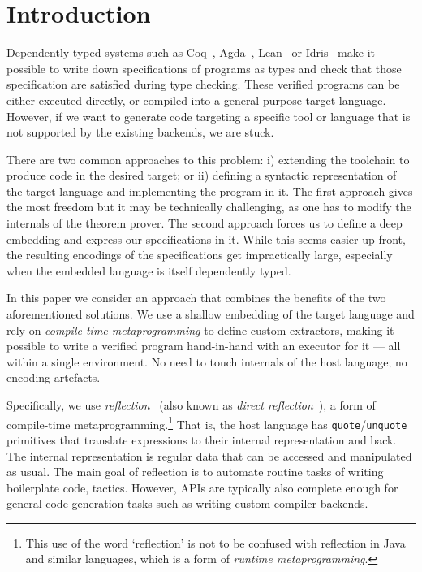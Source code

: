 \documentclass[acmsmall,review,anonymous]{acmart}\settopmatter{printfolios=true,printccs=false,printacmref=false}
\begin{document}
\section{Introduction}

Dependently-typed systems such as Coq~\cite{10.5555/1965123},
Agda~\cite{10.5555/1813347.1813352}, Lean~\cite{conf/cade/MouraKADR15}
or Idris~\cite{JFP:9060502} make it possible to write down specifications
of programs as types and check that those specification are satisfied
during type checking. These verified programs can be either executed
directly, or compiled into a
general-purpose target language.  However, if we want to generate code
targeting a specific tool or language that is not supported by the
existing backends, we are stuck.

There are two common approaches to this problem: i) extending the
toolchain to produce code in the desired target; or ii) defining
a syntactic representation of the target language and implementing
the program in it.  The first approach gives the most freedom but it
may be technically challenging, as one has to modify the internals of
the theorem prover.  The second approach forces us to define
a deep embedding and express our specifications in it.  While this
seems easier up-front, the resulting encodings of the specifications
get impractically large, especially when the embedded language is
itself dependently typed.

In this paper we consider an approach that combines the benefits of
the two aforementioned solutions. We use a shallow embedding of the
target language and rely on \emph{compile-time
metaprogramming} to define custom extractors, making it possible to
write a verified program hand-in-hand with an executor for it --- all
within a single environment.  No need to touch internals of the host
language; no encoding artefacts.

Specifically, we use
\emph{reflection}~\cite{idris-refl, lean-refl,metacoq,agda-refl} (also
known as \emph{direct reflection}~\cite{nuprl-refl}), a form of
compile-time metaprogramming.\footnote{This use of the word
`reflection' is not to be confused with reflection in Java and similar
languages, which is a form of \emph{runtime metaprogramming}.}
%
That is, the host language has \texttt{quote}/\texttt{unquote}
primitives that translate expressions to their internal representation
and back.  The internal representation is regular data that can be
accessed and manipulated as usual.  The main goal of
reflection is to automate routine tasks of writing
boilerplate code, \eg{} tactics.  However,  APIs are
typically also complete enough for general
code generation tasks such as writing custom compiler backends.
\end{document}
